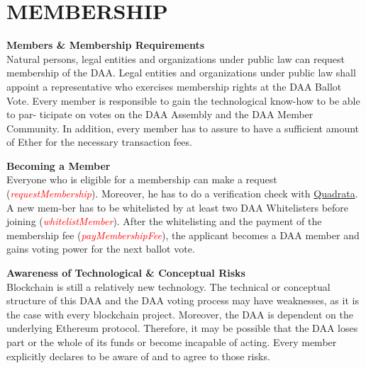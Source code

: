\section{MEMBERSHIP}

\item \textbf{Members \& Membership Requirements} \\
Natural persons, legal entities and organizations under public law can request membership of the DAA.
Legal entities and organizations under public law shall appoint a representative who exercises membership rights at the DAA Ballot Vote.
Every member is responsible to gain the technological know-how to be able to par- ticipate on votes on the DAA Assembly and the DAA Member Community.
In addition, every member has to assure to have a sufficient amount of Ether for the necessary transaction fees.

\item \textbf{Becoming a Member} \\
Everyone who is eligible for a membership can make a request (\textcolor{red}{\emph{requestMembership}}).
Moreover, he has to do a verification check with \href{https://quadrata.com/}{Quadrata}.
A new mem-ber has to be whitelisted by at least two DAA Whitelisters before joining (\textcolor{red}{\emph{whitelistMember}}).
After the whitelisting and the payment of the membership fee (\textcolor{red}{\emph{payMembershipFee}}), the applicant becomes a DAA member and gains voting power for the next ballot vote.

\item \textbf{Awareness of Technological \& Conceptual Risks} \\
Blockchain is still a relatively new technology.
The technical or conceptual structure of this DAA and the DAA voting process may have weaknesses, as it is the case with every blockchain project.
Moreover, the DAA is dependent on the underlying Ethereum protocol.
Therefore, it may be possible that the DAA loses part or the whole of its funds or become incapable of acting.
Every member explicitly declares to be aware of and to agree to those risks.
